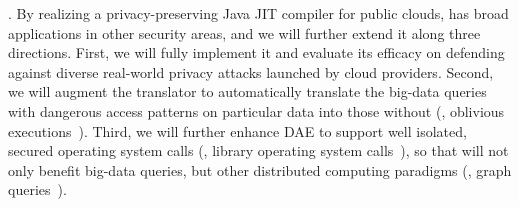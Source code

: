

. By realizing a privacy-preserving Java JIT compiler 
for public clouds, \maat has broad applications in other security areas, and we 
will further extend it along three directions. First, we will fully implement 
it and evaluate its efficacy on defending against diverse real-world privacy 
attacks launched by cloud providers. Second, we will augment the translator to 
automatically translate the big-data queries with dangerous access patterns on 
particular data into those without (\eg, oblivious 
executions~\cite{bigmatrix:ccs17}). Third, we will further enhance DAE to 
support well isolated, secured operating system calls (\eg, library operating 
system calls~\cite{graphene:atc17}), so that \maat will not only benefit 
big-data queries, but other distributed computing paradigms (\eg, graph 
queries~\cite{sigmod10:pregel}).



% 

